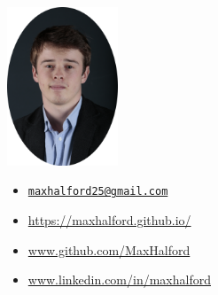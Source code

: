 \begin{minipage}{.25\textwidth}
\includegraphics[width=33mm]{img/face_oval}
\end{minipage}%
\begin{minipage}{.27\textwidth}
\end{minipage}%
\begin{minipage}{.48\textwidth}
\begin{itemize}
    \renewcommand\labelitemi{}
    \item \large{\faEnvelope} \textcolor{orange}{\href{mailto:maxhalford25@gmail.com}{\texttt{maxhalford25@gmail.com}}}
    \item \large{\faChild} \textcolor{magenta}{\url{https://maxhalford.github.io/}}
    \item \large{\faGithub} \textcolor{cyan}{\url{www.github.com/MaxHalford}}
    \item \large{\faLinkedin} \textcolor{green}{\url{www.linkedin.com/in/maxhalford}}
\end{itemize}
\end{minipage}